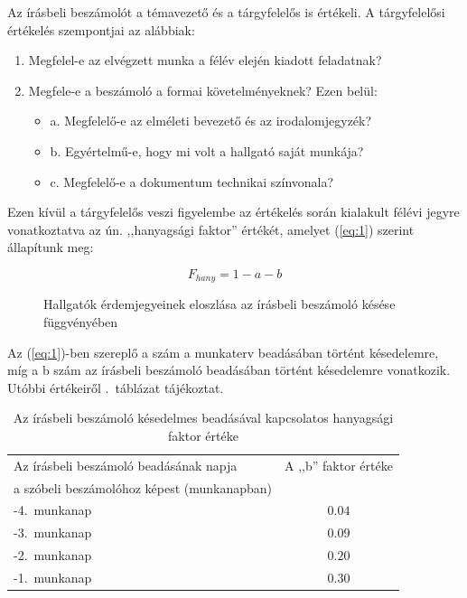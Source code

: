 \documentclass[a4paper,oneside]{article}
\begin{document}
Az írásbeli beszámolót a témavezető és a tárgyfelelős is értékeli. A
tárgyfelelősi értékelés szempontjai az alábbiak:
\begin{enumerate}
\item Megfelel-e az elvégzett munka a félév elején kiadott feladatnak?
\item Megfele-e a beszámoló a formai követelményeknek? Ezen belül:
  \begin{itemize}
  \item a. Megfelelő-e az elméleti bevezető és az irodalomjegyzék?
  \item b. Egyértelmű-e, hogy mi volt a hallgató saját munkája?
  \item c. Megfelelő-e a dokumentum technikai színvonala?
  \end{itemize}

\end{enumerate}
Ezen kívül a tárgyfelelős veszi figyelembe az értékelés során
kialakult félévi jegyre vonatkoztatva az ún. ,,hanyagsági faktor''
értékét, amelyet (\ref{eq:1}) szerint állapítunk meg:

\begin{equation}
    F_{hany} = 1 - a - b
  \label{eq:1}
\end{equation}


\begin{figure}[tbh]
  \centering
  \caption{Hallgatók érdemjegyeinek eloszlása az írásbeli beszámoló késése függvényében}
  \label{fig:fig1}
\end{figure}

Az (\ref{eq:1})-ben szereplő a szám a munkaterv beadásában történt
késedelemre, míg a b szám az írásbeli beszámoló beadásában történt
késedelemre vonatkozik.  Utóbbi értékeiről
.~táblázat tájékoztat.

\begin{table}
  \centering
    \begin{tabular}{|l|c|}
      \hline
      Az írásbeli beszámoló beadásának napja     & A ,,b'' faktor értéke \\
      a szóbeli beszámolóhoz képest (munkanapban) & ~ \\ \hline          
      -4.~munkanap & $0.04$ \\ \hline 
      -3.~munkanap & $0.09$ \\ \hline 
      -2.~munkanap & $0.20$ \\ \hline 
      -1.~munkanap & $0.30$ \\ \hline
      \end{tabular}
    \caption{Az írásbeli beszámoló késedelmes beadásával kapcsolatos hanyagsági faktor értéke}
  \label{tab:hanyagsagi}
\end{table}
\end{document}
